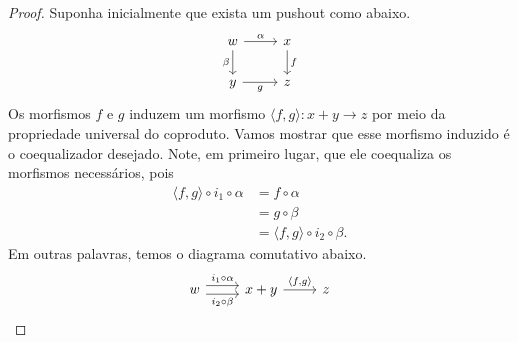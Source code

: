 \begin{proof}
    Suponha inicialmente que exista um pushout como abaixo.
    \begin{displaymath}
        \begin{tikzcd}
            w
            \arrow[r, "\alpha"]
            \arrow[d, "\beta" swap]
            & x
            \arrow[d, "f"]
            \\ y
            \arrow[r, "g" swap]
            & z
        \end{tikzcd}
    \end{displaymath}
    Os morfismos $f$ e $g$ induzem um morfismo $\langle f,g \rangle: x +y \to z$ por meio da propriedade universal do coproduto.
    Vamos mostrar que esse morfismo induzido é o coequalizador desejado.
    Note, em primeiro lugar, que ele coequaliza os morfismos necessários, pois
    \begin{align*}
        \langle f,g \rangle \circ i_1 \circ \alpha
        & = f \circ \alpha \\
        & = g \circ \beta \\
        & = \langle f,g \rangle \circ i_2 \circ \beta.
    \end{align*}
    Em outras palavras, temos o diagrama comutativo abaixo.
    \begin{displaymath}
        \begin{tikzcd}
            w
            \arrow[r, shift left=1.25, "i_1 \circ \alpha"]
            \arrow[r, shift right=1.25, "i_2 \circ \beta" swap]
            & x+y
            \arrow[r, "{\langle f,g \rangle}"]
            & z
        \end{tikzcd}
    \end{displaymath}


\end{proof}
